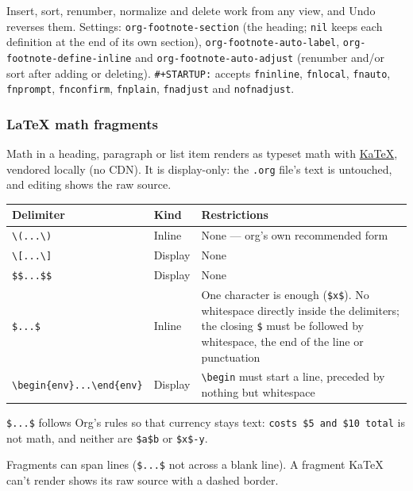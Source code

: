\documentclass[11pt]{article}
\begin{document}
Insert, sort, renumber, normalize and delete work from any view, and Undo reverses them. Settings: \texttt{org-footnote-section} (the heading; \texttt{nil} keeps each definition at the end of its own section), \texttt{org-footnote-auto-label}, \texttt{org-footnote-define-inline} and \texttt{org-footnote-auto-adjust} (renumber and/or sort after adding or deleting). \texttt{\#+STARTUP:} accepts \texttt{fninline}, \texttt{fnlocal}, \texttt{fnauto}, \texttt{fnprompt}, \texttt{fnconfirm}, \texttt{fnplain}, \texttt{fnadjust} and \texttt{nofnadjust}.

\subsubsection{\LaTeX{} math fragments}
\label{sec:org51119e5}
Math in a heading, paragraph or list item renders as typeset math with \href{https://katex.org}{KaTeX}, vendored locally (no CDN). It is display-only: the \texttt{.org} file's text is untouched, and editing shows the raw source.

\begin{center}
\begin{tabular}{lll}
Delimiter & Kind & Restrictions\\[0pt]
\hline
\texttt{\textbackslash{}(...\textbackslash{})} & Inline & None — org's own recommended form\\[0pt]
\texttt{\textbackslash{}[...\textbackslash{}]} & Display & None\\[0pt]
\texttt{\$\$...\$\$} & Display & None\\[0pt]
\texttt{\$...\$} & Inline & One character is enough (\texttt{\$x\$}). No whitespace directly inside the delimiters; the closing \texttt{\$} must be followed by whitespace, the end of the line or punctuation\\[0pt]
\texttt{\textbackslash{}begin\{env\}...\textbackslash{}end\{env\}} & Display & \texttt{\textbackslash{}begin} must start a line, preceded by nothing but whitespace\\[0pt]
\end{tabular}
\end{center}

\texttt{\$...\$} follows Org's rules so that currency stays text: \texttt{costs \$5 and \$10 total} is not math, and neither are \texttt{\$a\$b} or \texttt{\$x\$-y}.

Fragments can span lines (\texttt{\$...\$} not across a blank line). A fragment KaTeX can't render shows its raw source with a dashed border.
\end{document}
